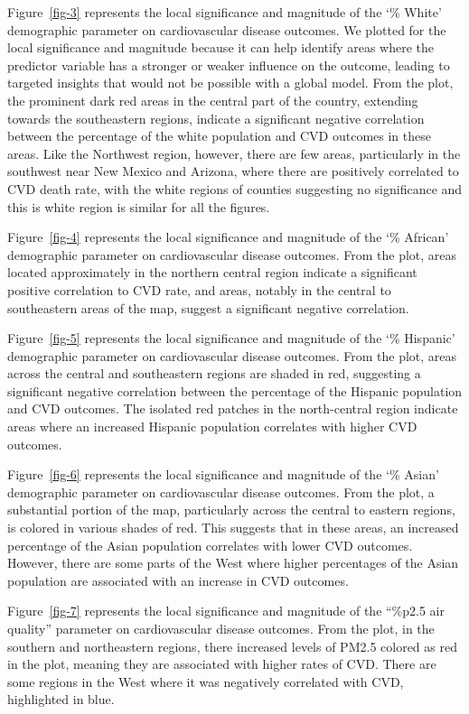 \documentclass[
]{article}
\begin{document}
Figure~\ref{fig-3} represents the local significance and magnitude of
the `\% White' demographic parameter on cardiovascular disease outcomes.
We plotted for the local significance and magnitude because it can help
identify areas where the predictor variable has a stronger or weaker
influence on the outcome, leading to targeted insights that would not be
possible with a global model. From the plot, the prominent dark red
areas in the central part of the country, extending towards the
southeastern regions, indicate a significant negative correlation
between the percentage of the white population and CVD outcomes in these
areas. Like the Northwest region, however, there are few areas,
particularly in the southwest near New Mexico and Arizona, where there
are positively correlated to CVD death rate, with the white regions of
counties suggesting no significance and this is white region is similar
for all the figures.

Figure~\ref{fig-4} represents the local significance and magnitude of
the `\% African' demographic parameter on cardiovascular disease
outcomes. From the plot, areas located approximately in the northern
central region indicate a significant positive correlation to CVD rate,
and areas, notably in the central to southeastern areas of the map,
suggest a significant negative correlation.

Figure~\ref{fig-5} represents the local significance and magnitude of
the `\% Hispanic' demographic parameter on cardiovascular disease
outcomes. From the plot, areas across the central and southeastern
regions are shaded in red, suggesting a significant negative correlation
between the percentage of the Hispanic population and CVD outcomes. The
isolated red patches in the north-central region indicate areas where an
increased Hispanic population correlates with higher CVD outcomes.~

Figure~\ref{fig-6} represents the local significance and magnitude of
the `\% Asian' demographic parameter on cardiovascular disease outcomes.
From the plot, a substantial portion of the map, particularly across the
central to eastern regions, is colored in various shades of red. This
suggests that in these areas, an increased percentage of the Asian
population correlates with lower CVD outcomes. However, there are some
parts of the West where higher percentages of the Asian population are
associated with an increase in CVD outcomes.~

Figure~\ref{fig-7} represents the local significance and magnitude of
the ``\%p2.5 air quality'' parameter on cardiovascular disease outcomes.
From the plot, in the southern and northeastern regions, there increased
levels of PM2.5 colored as red in the plot, meaning they are associated
with higher rates of CVD. There are some regions in the West where it
was negatively correlated with CVD, highlighted in blue.
\end{document}
